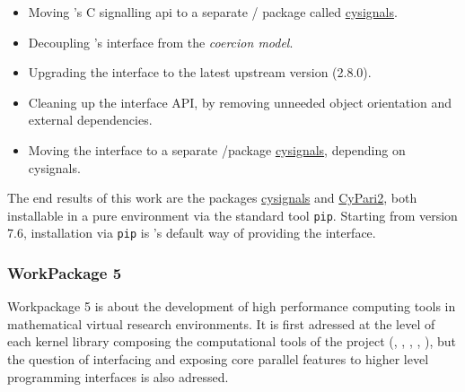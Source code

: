 \documentclass{deliverablereport}
\begin{document}
\begin{itemize}
\tightlist
\item Moving \Sage's C signalling api to a separate \Python/\Cython
  package called
  \href{https://github.com/sagemath/cysignals}{cysignals}.
\item Decoupling \Sage's \Pari interface from the \emph{coercion
    model}.
\item Upgrading the \Pari interface to the latest upstream version
  (2.8.0).
\item Cleaning up the \Pari interface API, by removing unneeded object
  orientation and external dependencies.
\item Moving the \Pari interface to a separate \Python/\Cython package
  \href{https://github.com/sagemath/cysignals}{cysignals}, depending
  on cysignals.
\end{itemize}

The end results of this work are the packages
\href{https://github.com/sagemath/cysignals}{cysignals} and
\href{https://github.com/sagemath/cypari2}{CyPari2}, both installable
in a pure \Python environment via the standard tool
\texttt{pip}. Starting from version 7.6, installation via \texttt{pip}
is \Sage's default way of providing the \Pari interface.





  \subsubsection{WorkPackage 5}

  Workpackage 5 is about the development of high performance computing tools in
  mathematical virtual research environments. It is first adressed at the level
  of each kernel library composing the computational tools of the project (\Pari,
  \GAP, \Linbox, \Singular, \MPIR), but the question of interfacing and exposing
  core parallel features to higher level programming interfaces is also
  adressed.
  
\end{document}
